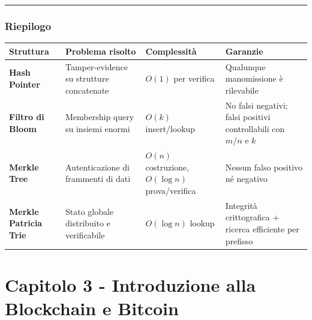 \documentclass[
  italian,
  openany]{book}
\newcounter{none} %
\begin{document}
\begin{center}\rule{0.5\linewidth}{0.5pt}\end{center}

\subsection{Riepilogo}\label{riepilogo}

{\def\LTcaptype{none} %
\begin{longtable}[]{@{}
  >{\raggedright\arraybackslash}p{}
  >{\raggedright\arraybackslash}p{}
  >{\raggedright\arraybackslash}p{}
  >{\raggedright\arraybackslash}p{}@{}}
\toprule\noalign{}
\begin{minipage}[b]{\linewidth}\raggedright
Struttura
\end{minipage} & \begin{minipage}[b]{\linewidth}\raggedright
Problema risolto
\end{minipage} & \begin{minipage}[b]{\linewidth}\raggedright
Complessità
\end{minipage} & \begin{minipage}[b]{\linewidth}\raggedright
Garanzie
\end{minipage} \\
\midrule\noalign{}
\endhead
\bottomrule\noalign{}
\endlastfoot
\textbf{Hash Pointer} & Tamper-evidence su strutture concatenate &
\(O(1)\) per verifica & Qualunque manomissione è rilevabile \\
\textbf{Filtro di Bloom} & Membership query su insiemi enormi & \(O(k)\)
insert/lookup & No falsi negativi; falsi positivi controllabili con
\(m/n\) e \(k\) \\
\textbf{Merkle Tree} & Autenticazione di frammenti di dati & \(O(n)\)
costruzione, \(O(\log n)\) prova/verifica & Nessun falso positivo né
negativo \\
\textbf{Merkle Patricia Trie} & Stato globale distribuito e verificabile
& \(O(\log n)\) lookup & Integrità crittografica + ricerca efficiente
per prefisso \\
\end{longtable}
}

\newpage

\chapter{Capitolo 3 - Introduzione alla Blockchain e
Bitcoin}\label{capitolo-3---introduzione-alla-blockchain-e-bitcoin}
\end{document}
